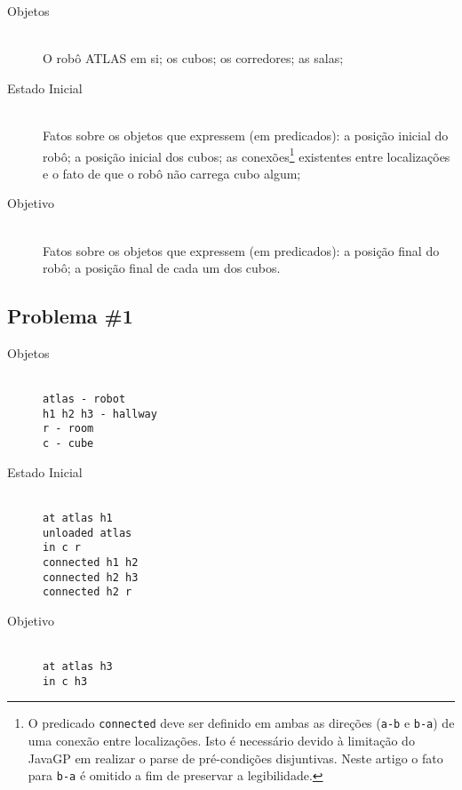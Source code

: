 \documentclass[letterpaper]{article}
\begin{document}
\begin{description}
  \item[Objetos]\hfill\\O robô ATLAS em si; os cubos; os corredores; as salas;
  \item[Estado Inicial]\hfill\\Fatos sobre os objetos que expressem (em predicados): a posição inicial do robô; a posição inicial dos cubos; as conexões\footnote{O predicado \texttt{connected} deve ser definido em ambas as direções (\texttt{a-b} e \texttt{b-a}) de uma conexão entre localizações. Isto é necessário devido à limitação do JavaGP em realizar o parse de pré-condições disjuntivas. Neste artigo o fato para \texttt{b-a} é omitido a fim de preservar a legibilidade.} existentes entre localizações e o fato de que o robô não carrega cubo algum;
  \item[Objetivo]\hfill\\Fatos sobre os objetos que expressem (em predicados): a posição final do robô; a posição final de cada um dos cubos.
\end{description}

\subsection{Problema \#1}
\begin{description}
  \item[Objetos]\hfill\\
    \texttt{atlas - robot\\h1 h2 h3 - hallway\\r - room\\c - cube}
  \item[Estado Inicial]\hfill\\
    \texttt{at atlas h1\\unloaded atlas\\in c r\\connected h1 h2\\connected h2 h3\\connected h2 r}
  \item[Objetivo]\hfill\\
    \texttt{at atlas h3\\in c h3}
\end{description}
\end{document}

